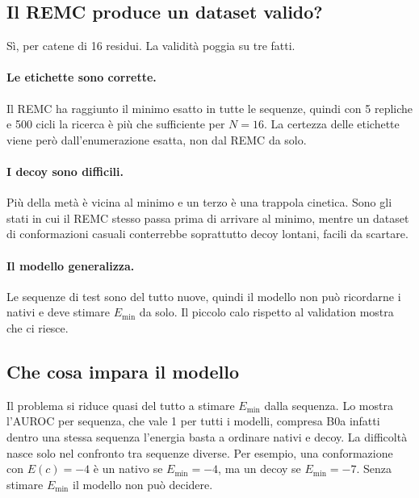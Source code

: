 \documentclass[11pt,a4paper]{article}
\newcommand{\Emin}{E_{\min}}
\begin{document}
\subsection{Il REMC produce un dataset valido?}
\label{sec:valido}

Sì, per catene di 16 residui. La validità poggia su tre fatti.

\paragraph{Le etichette sono corrette.} Il REMC ha raggiunto il minimo esatto in tutte le sequenze, quindi con 5 repliche e 500 cicli la ricerca è più che sufficiente per $N = 16$. La certezza delle etichette viene però dall'enumerazione esatta, non dal REMC da solo.

\paragraph{I decoy sono difficili.} Più della metà è vicina al minimo e un terzo è una trappola cinetica. Sono gli stati in cui il REMC stesso passa prima di arrivare al minimo, mentre un dataset di conformazioni casuali conterrebbe soprattutto decoy lontani, facili da scartare.

\paragraph{Il modello generalizza.} Le sequenze di test sono del tutto nuove, quindi il modello non può ricordarne i nativi e deve stimare $\Emin$ da solo. Il piccolo calo rispetto al validation mostra che ci riesce.

\subsection{Che cosa impara il modello}
\label{sec:impara}

Il problema si riduce quasi del tutto a stimare $\Emin$ dalla sequenza. Lo mostra l'AUROC per sequenza, che vale 1 per tutti i modelli, compresa B0a infatti dentro una stessa sequenza l'energia basta a ordinare nativi e decoy. La difficoltà nasce solo nel confronto tra sequenze diverse. Per esempio, una conformazione con $E(c) = -4$ è un nativo se $\Emin = -4$, ma un decoy se $\Emin = -7$. Senza stimare $\Emin$ il modello non può decidere.
\end{document}
